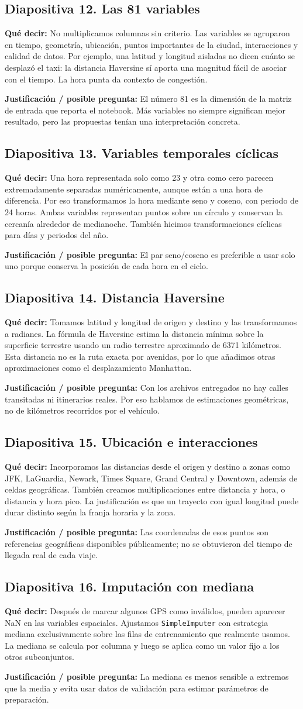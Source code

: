 \documentclass[11pt,letterpaper]{article}
\newcommand{\lamina}[2]{\subsection*{Diapositiva #1. #2}}
\newcommand{\explica}[1]{\noindent\textcolor{azul}{\textbf{Qué decir:}} #1\par\smallskip}
\newcommand{\defiende}[1]{\noindent\textcolor{verde}{\textbf{Justificación / posible pregunta:}} #1\par\medskip}
\begin{document}
\lamina{12}{Las 81 variables}
\explica{No multiplicamos columnas sin criterio. Las variables se agruparon en tiempo, geometría, ubicación, puntos importantes de la ciudad, interacciones y calidad de datos. Por ejemplo, una latitud y longitud aisladas no dicen cuánto se desplazó el taxi: la distancia Haversine sí aporta una magnitud fácil de asociar con el tiempo. La hora punta da contexto de congestión.}
\defiende{El número 81 es la dimensión de la matriz de entrada que reporta el notebook. Más variables no siempre significan mejor resultado, pero las propuestas tenían una interpretación concreta.}

\lamina{13}{Variables temporales cíclicas}
\explica{Una hora representada solo como 23 y otra como cero parecen extremadamente separadas numéricamente, aunque están a una hora de diferencia. Por eso transformamos la hora mediante seno y coseno, con periodo de 24 horas. Ambas variables representan puntos sobre un círculo y conservan la cercanía alrededor de medianoche. También hicimos transformaciones cíclicas para días y periodos del año.}
\defiende{El par seno/coseno es preferible a usar solo uno porque conserva la posición de cada hora en el ciclo.}

\lamina{14}{Distancia Haversine}
\explica{Tomamos latitud y longitud de origen y destino y las transformamos a radianes. La fórmula de Haversine estima la distancia mínima sobre la superficie terrestre usando un radio terrestre aproximado de 6371 kilómetros. Esta distancia no es la ruta exacta por avenidas, por lo que añadimos otras aproximaciones como el desplazamiento Manhattan.}
\defiende{Con los archivos entregados no hay calles transitadas ni itinerarios reales. Por eso hablamos de estimaciones geométricas, no de kilómetros recorridos por el vehículo.}

\lamina{15}{Ubicación e interacciones}
\explica{Incorporamos las distancias desde el origen y destino a zonas como JFK, LaGuardia, Newark, Times Square, Grand Central y Downtown, además de celdas geográficas. También creamos multiplicaciones entre distancia y hora, o distancia y hora pico. La justificación es que un trayecto con igual longitud puede durar distinto según la franja horaria y la zona.}
\defiende{Las coordenadas de esos puntos son referencias geográficas disponibles públicamente; no se obtuvieron del tiempo de llegada real de cada viaje.}

\lamina{16}{Imputación con mediana}
\explica{Después de marcar algunos GPS como inválidos, pueden aparecer NaN en las variables espaciales. Ajustamos \texttt{SimpleImputer} con estrategia mediana exclusivamente sobre las filas de entrenamiento que realmente usamos. La mediana se calcula por columna y luego se aplica como un valor fijo a los otros subconjuntos.}
\defiende{La mediana es menos sensible a extremos que la media y evita usar datos de validación para estimar parámetros de preparación.}
\end{document}
